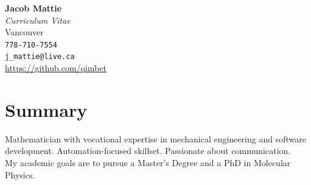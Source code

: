 \documentclass[a4paper,10pt]{article}
\begin{document}
	\begin{center}
		{\Huge \bfseries Jacob Mattie} \\[0.5em]
		\textit{Curriculum Vitae}\\[0.5em]
		Vancouver \\
		\texttt{778-710-7554} \\
		\texttt{j\_mattie@live.ca} \\
		\href{https://github.com/qimbet}{https://github.com/qimbet}
	\end{center}
	
	\vspace{1em}
	
	\section*{Summary}
	Mathematician with vocational expertise in mechanical engineering and software development. Automation-focused skillset. Passionate about communication.\\[0.5em]
	My academic goals are to pursue a Master's Degree and a PhD in Molecular Physics.
	
\end{document}
